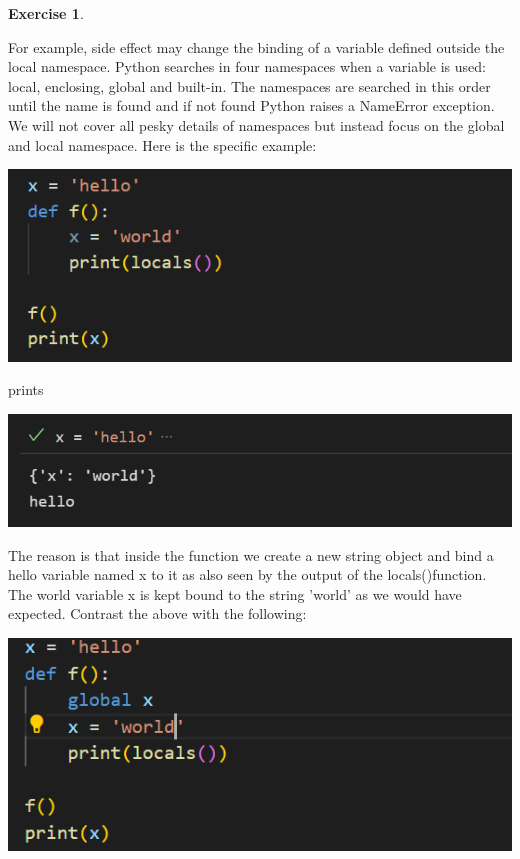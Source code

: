 \documentclass[11pt,a4paper,leqno]{article}
\theoremstyle{definition}
\newtheorem{exercise}{Exercise}
\begin{document}
\begin{exercise}
\begin{enumerate}
For example, side effect may change the binding of a variable defined outside the local namespace.
Python searches in four namespaces when a variable is used: local, enclosing, global and built-in. The namespaces are searched in this order until the name is found and if not found Python raises a NameError exception. We will not cover all pesky details of namespaces but instead focus on the global and local namespace. Here is the specific example:\par
\begin{center}
    \includegraphics[scale=0.8]{example1.png}
\end{center}
prints\par
\begin{center}
    \includegraphics[scale=0.8]{example2.png}
\end{center}
The reason is that inside the function we create a new string object and bind a hello variable named x to it as also seen by the output of the locals()function. The world variable x is kept bound to the string 'world' as we would have expected. Contrast the above with the following:\par
\begin{center}
    \includegraphics[scale=0.8]{example3.png}

\end{center}
\end{enumerate}
\end{exercise}
\end{document}
